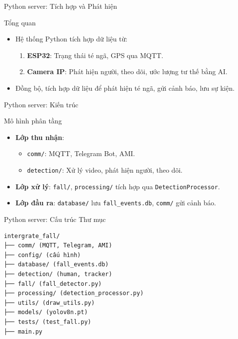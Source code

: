 \begin{frame}{Python server: Tích hợp và Phát hiện}
    \begin{block}{Tổng quan}
        \begin{itemize}
            \item Hệ thống Python tích hợp dữ liệu từ:
            \begin{enumerate}
                \item \textbf{ESP32}: Trạng thái té ngã, GPS qua MQTT.
                \item \textbf{Camera IP}: Phát hiện người, theo dõi, ước lượng tư thế bằng AI.
            \end{enumerate}
            \item Đồng bộ, tích hợp dữ liệu để phát hiện té ngã, gửi cảnh báo, lưu sự kiện.
        \end{itemize}
    \end{block}
    \label{sec:server_overview}
\end{frame}

\begin{frame}{Python server: Kiến trúc}
    \begin{block}{Mô hình phân tầng}
        \begin{itemize}
            \item \textbf{Lớp thu nhận}: 
                \begin{itemize}
                    \item \texttt{comm/}: MQTT, Telegram Bot, AMI.
                    \item \texttt{detection/}: Xử lý video, phát hiện người, theo dõi.
                \end{itemize}
            \item \textbf{Lớp xử lý}: \texttt{fall/}, \texttt{processing/} tích hợp qua \texttt{DetectionProcessor}.
            \item \textbf{Lớp đầu ra}: \texttt{database/} lưu \texttt{fall\_events.db}, \texttt{comm/} gửi cảnh báo.
        \end{itemize}
    \end{block}
    \label{subsubsec:system_overview}
\end{frame}

\begin{frame}[fragile]{Python server: Cấu trúc Thư mục}
    \renewcommand{\baselinestretch}{0.8}
    \begin{verbatim}
intergrate_fall/
├── comm/ (MQTT, Telegram, AMI)
├── config/ (cấu hình)
├── database/ (fall_events.db)
├── detection/ (human, tracker)
├── fall/ (fall_detector.py)
├── processing/ (detection_processor.py)
├── utils/ (draw_utils.py)
├── models/ (yolov8n.pt)
├── tests/ (test_fall.py)
├── main.py
    \end{verbatim}
    \renewcommand{\baselinestretch}{1.0}
    \label{subsubsec:project_structure}
\end{frame}

